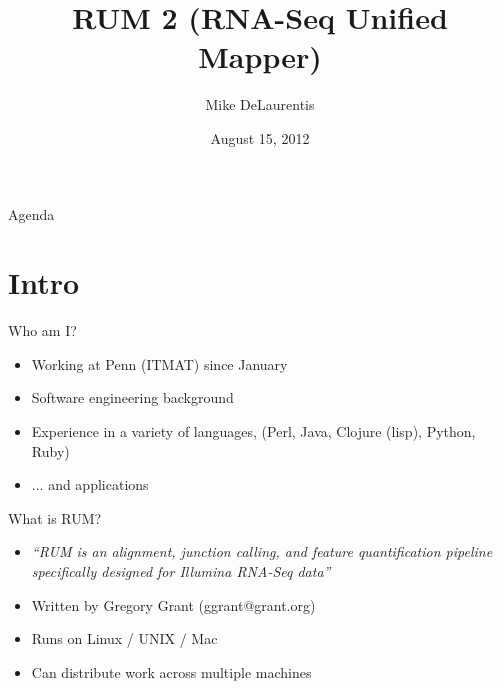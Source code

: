 \documentclass{beamer}
\title[RUM 2]{RUM 2 (RNA-Seq Unified Mapper)}
\author{Mike DeLaurentis}
\institute{University of Pennsylvania}
\date{August 15, 2012}
\begin{document}
\begin{frame}
\titlepage
\end{frame}

\begin{frame}{Agenda}
  \tableofcontents
\end{frame}

\section{Intro}

\begin{frame}{Who am I?}
  \begin{itemize}
  \item Working at Penn (ITMAT) since January
  \item Software engineering background
  \item Experience in a variety of languages, (Perl, Java, Clojure (lisp), Python, Ruby)
  \item ... and applications
  \end{itemize}
\end{frame}

\begin{frame}{What is RUM?}
  \begin{itemize}
  \item \textit{``RUM is an alignment, junction calling, and feature quantification pipeline specifically designed for Illumina RNA-Seq data''}
  \item Written by Gregory Grant (ggrant@grant.org)
  \item Runs on Linux / UNIX / Mac
  \item Can distribute work across multiple machines
  \end{itemize}
\end{frame}
\end{document}

